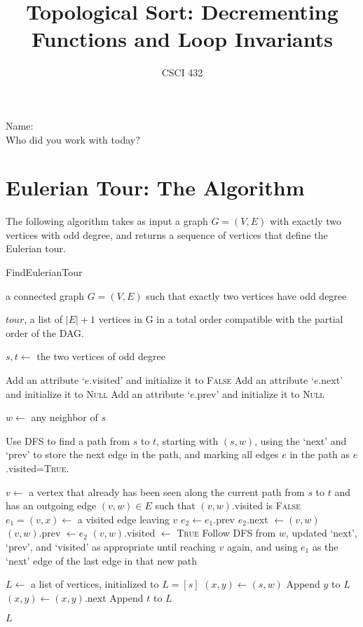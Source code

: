 \documentclass{article}
\title{Topological Sort: Decrementing Functions and Loop Invariants}
\author{CSCI 432}
\begin{document}
\maketitle

\noindent
Name:\\
Who did you work with today?

\section*{Eulerian Tour: The Algorithm}

The following algorithm takes as input a graph $G=(V,E)$ with exactly two
vertices with odd degree, and returns a sequence
of vertices that define the Eulerian tour.

\begin{algorithm}[h]
    \caption{FindEulerianTour}
    \begin{algorithmic}[1]
        \REQUIRE a connected graph $G=(V,E)$ such that exactly two vertices have odd
        degree

        \ENSURE $tour$, a list of $|E|+1$ vertices in G in a total order compatible with
        the partial order of the DAG.

        \STATE $s,t \gets$ the two vertices of odd degree

            \STATE Add an attribute `$e$.visited' and initialize it to \textsc{False}
            \STATE Add an attribute `$e$.next' and initialize it to \textsc{Null}
            \STATE Add an attribute `$e$.prev' and initialize it to \textsc{Null}
        \ENDFOR

        \STATE $w \gets$ any neighbor of $s$

        \STATE Use DFS to find a path from $s$ to $t$, starting with $(s,w)$,
        using the `next' and `prev' to store the next edge in the path,  and marking all
        edges $e$ in the path as $e$.visited=\textsc{True}.

            \STATE $v\gets$ a vertex that already has been seen along the
                current path from $s$ to $t$ and has an outgoing edge $(v,w) \in
                E$ such that $(v,w)$.visited is \textsc{False}
            \STATE $e_1=(v,x) \gets $ a visited edge leaving $v$
            \STATE $e_2 \gets e_1.$prev
            \STATE $e_2$.next $\gets (v,w)$
            \STATE $(v,w).$prev $\gets e_2$
            \STATE $(v,w)$.visited $\gets$ \textsc{True}
            \STATE Follow DFS from $w$, updated `next', `prev', and `visited' as
                appropriate until reaching $v$ again, and using $e_1$ as the
                `next' edge of the last edge in that new path
        \ENDWHILE

        \STATE $L \gets$ a list of vertices, initialized to $L=[s]$
        \STATE $(x,y) \gets (s,w)$
            \STATE Append $y$ to $L$
            \STATE $(x,y) \gets (x,y)$.next
        \ENDWHILE
        \STATE Append $t$ to $L$

        \RETURN $L$
    \end{algorithmic}
\end{algorithm}
\end{document}
